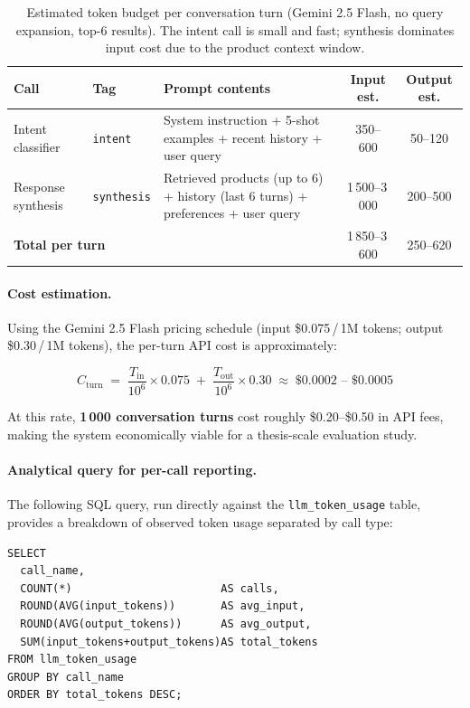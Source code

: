 \documentclass[12pt,a4paper]{article}
\begin{document}
\begin{table}[H]
\centering
\begin{tabularx}{\linewidth}{llXcc}
\toprule
\textbf{Call} & \textbf{Tag} & \textbf{Prompt contents} &
\textbf{Input est.} & \textbf{Output est.} \\
\midrule
Intent classifier &
\texttt{intent} &
System instruction + 5-shot examples + recent history +
user query &
350--600 & 50--120 \\
Response synthesis &
\texttt{synthesis} &
Retrieved products (up to 6) + history (last 6 turns) +
preferences + user query &
1\,500--3\,000 & 200--500 \\
\midrule
\multicolumn{3}{l}{\textbf{Total per turn}} &
1\,850--3\,600 & 250--620 \\
\bottomrule
\end{tabularx}
\caption{Estimated token budget per conversation turn
(Gemini 2.5 Flash, no query expansion, top-6 results).
The intent call is small and fast; synthesis dominates
input cost due to the product context window.}
\label{tab:token_calls}
\end{table}

\paragraph{Cost estimation.}

Using the Gemini 2.5 Flash pricing schedule
(input \$0.075\,/\,1M tokens; output \$0.30\,/\,1M tokens),
the per-turn API cost is approximately:

\[
C_{\text{turn}} \;=\;
\frac{T_{\text{in}}}{10^6}\times 0.075
\;+\;
\frac{T_{\text{out}}}{10^6}\times 0.30
\;\approx\; \$0.0002 \text{ -- } \$0.0005
\]

At this rate, \textbf{1\,000 conversation turns} cost roughly
\$0.20--\$0.50 in API fees, making the system economically
viable for a thesis-scale evaluation study.

\paragraph{Analytical query for per-call reporting.}

The following SQL query, run directly against the
\texttt{llm\_token\_usage} table, provides a breakdown
of observed token usage separated by call type:

\begin{verbatim}
SELECT
  call_name,
  COUNT(*)                       AS calls,
  ROUND(AVG(input_tokens))       AS avg_input,
  ROUND(AVG(output_tokens))      AS avg_output,
  SUM(input_tokens+output_tokens)AS total_tokens
FROM llm_token_usage
GROUP BY call_name
ORDER BY total_tokens DESC;
\end{verbatim}
\end{document}
